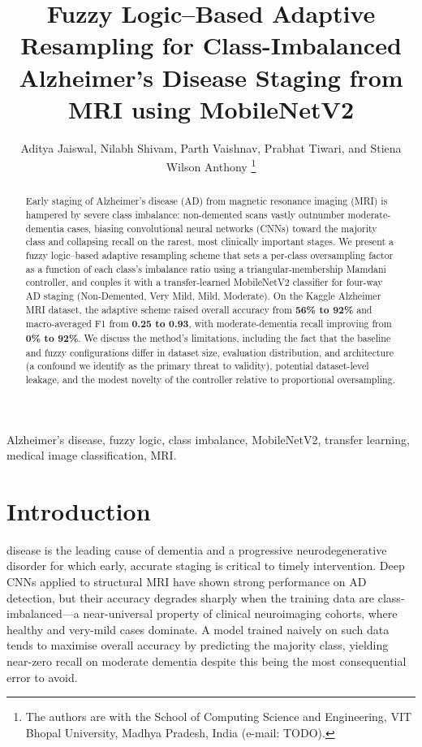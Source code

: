\documentclass[journal]{IEEEtran}
\begin{document}
\title{Fuzzy Logic--Based Adaptive Resampling for Class-Imbalanced
Alzheimer's Disease Staging from MRI using MobileNetV2}

\author{Aditya Jaiswal, Nilabh Shivam, Parth Vaishnav, Prabhat Tiwari,
and Stiena Wilson Anthony%
\thanks{The authors are with the School of Computing Science and Engineering,
VIT Bhopal University, Madhya Pradesh, India (e-mail: TODO).}}

\maketitle

\begin{abstract}
Early staging of Alzheimer's disease (AD) from magnetic resonance imaging (MRI)
is hampered by severe class imbalance: non-demented scans vastly outnumber
moderate-dementia cases, biasing convolutional neural networks (CNNs) toward the
majority class and collapsing recall on the rarest, most clinically important
stages. We present a fuzzy logic--based adaptive resampling scheme that sets a
per-class oversampling factor as a function of each class's imbalance ratio
using a triangular-membership Mamdani controller, and couples it with a
transfer-learned MobileNetV2 classifier for four-way AD staging (Non-Demented,
Very Mild, Mild, Moderate). On the Kaggle Alzheimer MRI dataset, the adaptive
scheme raised overall accuracy from \textbf{56\% to 92\%} and macro-averaged F1
from \textbf{0.25 to 0.93}, with moderate-dementia recall improving from
\textbf{0\% to 92\%}. We discuss the method's limitations, including the fact
that the baseline and fuzzy configurations differ in dataset size, evaluation
distribution, and architecture (a confound we identify as the primary threat to
validity), potential dataset-level leakage, and the modest novelty of the
controller relative to proportional oversampling.
\end{abstract}

\begin{IEEEkeywords}
Alzheimer's disease, fuzzy logic, class imbalance, MobileNetV2, transfer
learning, medical image classification, MRI.
\end{IEEEkeywords}

\section{Introduction}
 disease is the leading cause of dementia and a
progressive neurodegenerative disorder for which early, accurate staging is
critical to timely intervention. Deep CNNs applied to structural MRI have shown
strong performance on AD detection, but their accuracy degrades sharply when the
training data are class-imbalanced---a near-universal property of clinical
neuroimaging cohorts, where healthy and very-mild cases dominate. A model trained
naively on such data tends to maximise overall accuracy by predicting the
majority class, yielding near-zero recall on moderate dementia despite this being
the most consequential error to avoid.
\end{document}
